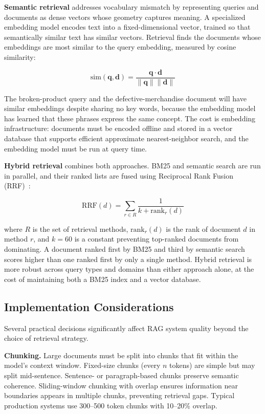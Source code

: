 \documentclass{book}
\begin{document}
\textbf{Semantic retrieval} addresses vocabulary mismatch by representing
queries and documents as dense vectors whose geometry captures meaning.
A specialized embedding model encodes text into a fixed-dimensional vector,
trained so that semantically similar text has similar vectors. Retrieval
finds the documents whose embeddings are most similar to the query embedding,
measured by cosine similarity:

\begin{equation}
\label{eq:cosine}
\text{sim}(\mathbf{q}, \mathbf{d}) =
    \frac{\mathbf{q} \cdot \mathbf{d}}{\|\mathbf{q}\| \|\mathbf{d}\|}
\end{equation}

The broken-product query and the defective-merchandise document will have
similar embeddings despite sharing no key words, because the embedding
model has learned that these phrases express the same concept. The cost
is embedding infrastructure: documents must be encoded offline and stored
in a vector database that supports efficient approximate nearest-neighbor
search, and the embedding model must be run at query time.

\textbf{Hybrid retrieval} combines both approaches. BM25 and semantic
search are run in parallel, and their ranked lists are fused using
Reciprocal Rank Fusion (RRF)~\cite{cormack2009reciprocal}:

\begin{equation}
\label{eq:rrf}
\text{RRF}(d) = \sum_{r \in R} \frac{1}{k + \text{rank}_r(d)}
\end{equation}

where $R$ is the set of retrieval methods, $\text{rank}_r(d)$ is the rank
of document $d$ in method $r$, and $k = 60$ is a constant preventing
top-ranked documents from dominating. A document ranked first by BM25 and
third by semantic search scores higher than one ranked first by only a
single method. Hybrid retrieval is more robust across query types and
domains than either approach alone, at the cost of maintaining both a
BM25 index and a vector database.

\subsection{Implementation Considerations}
\label{sec:rag_impl}

Several practical decisions significantly affect RAG system quality beyond
the choice of retrieval strategy.

\textbf{Chunking.} Large documents must be split into chunks that fit
within the model's context window. Fixed-size chunks (every $n$ tokens)
are simple but may split mid-sentence. Sentence- or paragraph-based
chunks preserve semantic coherence. Sliding-window chunking with overlap
ensures information near boundaries appears in multiple chunks, preventing
retrieval gaps. Typical production systems use 300--500 token chunks with
10--20\% overlap.
\end{document}
